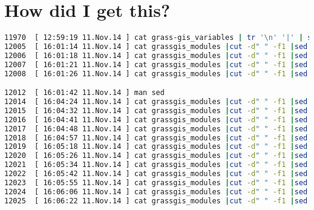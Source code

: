 \appendix

\section{How did I get this?}
\begin{fullwidth}
\begin{lstlisting}[basicstyle={\tiny\ttfamily},language=bash,tabsize=4]
11970  [ 12:59:19 11.Nov.14 ] cat grass-gis_variables | tr '\n' '|' | sed 's/|/", "/g'
12005  [ 16:01:14 11.Nov.14 ] cat grassgis_modules |cut -d" " -f1 |sed -e /\n//
12006  [ 16:01:18 11.Nov.14 ] cat grassgis_modules |cut -d" " -f1 |sed -e '/\n//'
12007  [ 16:01:21 11.Nov.14 ] cat grassgis_modules |cut -d" " -f1 |sed e '/\n//'
12008  [ 16:01:26 11.Nov.14 ] cat grassgis_modules |cut -d" " -f1 |sed  's/\n//'

12012  [ 16:01:42 11.Nov.14 ] man sed
12014  [ 16:04:24 11.Nov.14 ] cat grassgis_modules |cut -d" " -f1 |sed '/^\s*$/d'
12015  [ 16:04:32 11.Nov.14 ] cat grassgis_modules |cut -d" " -f1 |sed '/^\s*$/d' |grep '^v.'
12016  [ 16:04:41 11.Nov.14 ] cat grassgis_modules |cut -d" " -f1 |sed '/^\s*$/d' |grep '^v.' > grassgis_modules_vector
12017  [ 16:04:48 11.Nov.14 ] cat grassgis_modules |cut -d" " -f1 |sed '/^\s*$/d' |grep '^r.' > grassgis_modules_raster
12018  [ 16:04:57 11.Nov.14 ] cat grassgis_modules |cut -d" " -f1 |sed '/^\s*$/d' |grep '^g.' > grassgis_modules_general
12019  [ 16:05:18 11.Nov.14 ] cat grassgis_modules |cut -d" " -f1 |sed '/^\s*$/d' |grep '^i.' > grassgis_modules_imagery
12020  [ 16:05:26 11.Nov.14 ] cat grassgis_modules |cut -d" " -f1 |sed '/^\s*$/d' |grep '^db.' > grassgis_modules_db
12021  [ 16:05:34 11.Nov.14 ] cat grassgis_modules |cut -d" " -f1 |sed '/^\s*$/d' |grep '^t.' > grassgis_modules_temporal
12022  [ 16:05:42 11.Nov.14 ] cat grassgis_modules |cut -d" " -f1 |sed '/^\s*$/d' |grep '^d.' > grassgis_modules_display
12023  [ 16:05:55 11.Nov.14 ] cat grassgis_modules |cut -d" " -f1 |sed '/^\s*$/d' |grep '^m.' > grassgis_modules_miscellaneous
12024  [ 16:06:06 11.Nov.14 ] cat grassgis_modules |cut -d" " -f1 |sed '/^\s*$/d' |grep '^ps.' > grassgis_modules_postscript
12025  [ 16:06:22 11.Nov.14 ] cat grassgis_modules |cut -d" " -f1 |sed '/^\s*$/d' |grep '^r3.' > grassgis_modules_raster3d


\end{lstlisting}
\end{fullwidth}
